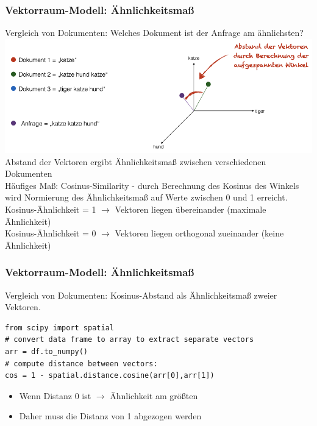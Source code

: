 \begin{frame}
\frametitle{Vektorraum-Modell: Ähnlichkeitsmaß}
    Vergleich von Dokumenten:
    Welches Dokument ist der Anfrage am ähnlichsten?
    \vspace{0.3cm}
    \includegraphics[width=\linewidth]{fig8/vector_space_distance}
    \scriptsize{Abstand der Vektoren ergibt Ähnlichkeitsmaß zwischen verschiedenen Dokumenten\\
    Häufiges Maß: Cosinus-Similarity - durch Berechnung des Kosinus des Winkels wird Normierung des Ähnlichkeitsmaß auf Werte zwischen 0 und 1 erreicht.\\
    Kosinus-Ähnlichkeit = 1 $\rightarrow$ Vektoren liegen übereinander (maximale Ähnlichkeit) \\
    Kosinus-Ähnlichkeit = 0  $\rightarrow$ Vektoren liegen orthogonal zueinander (keine Ähnlichkeit) }
    
\end{frame}
    
    
\begin{frame}[fragile]
    \frametitle{Vektorraum-Modell: Ähnlichkeitsmaß}
    Vergleich von Dokumenten: Kosinus-Abstand als Ähnlichkeitsmaß zweier Vektoren.

    \begin{verbatim}
from scipy import spatial
# convert data frame to array to extract separate vectors
arr = df.to_numpy()
# compute distance between vectors:
cos = 1 - spatial.distance.cosine(arr[0],arr[1])
    \end{verbatim}

    \begin{itemize}
    \item Wenn  Distanz 0 ist $\rightarrow$ Ähnlichkeit am größten 
    \item Daher muss die Distanz von 1 abgezogen werden
    \end{itemize}
\end{frame}
 
